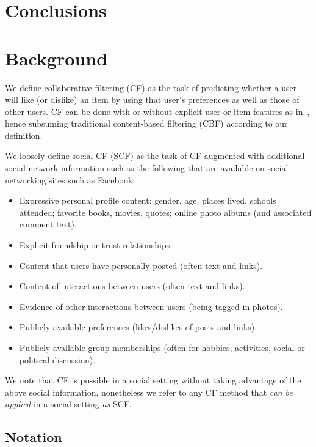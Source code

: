 \documentclass{sig-alternate}
\begin{document}
\label{sec:NovelAlgs}

\section{Conclusions}

\label{sec:Conclusions}

\section{Background}

We define collaborative filtering (CF) as the task of predicting
whether a user will like (or dislike) an item by using that user's
preferences as well as those of other users.  CF can be done with or
without explicit user or item features as in~\cite{matchbox}, hence
subsuming traditional content-based filtering (CBF) according to our
definition.

We loosely define social CF (SCF) as the task of CF augmented with
additional social network information such as the following that
are available on social networking sites such as Facebook:
\begin{itemize}
\item Expressive personal profile content: gender, age, places lived, schools
attended; favorite books, movies, quotes; online photo albums (and associated comment text).
\item Explicit friendship or trust relationships.
\item Content that users have personally posted (often text and links).
\item Content of interactions between users (often text and links).
\item Evidence of other interactions between users (being tagged in photos).
\item Publicly available preferences (likes/dislikes of posts and links).
\item Publicly available group memberships (often for hobbies, activities, social or political discussion).
\end{itemize}
We note that CF is possible in a social setting without taking advantage
of the above social information, nonetheless we refer to any CF method
that \emph{can be applied} in a social setting \emph{as} SCF.

\subsection{Notation}
\end{document}
